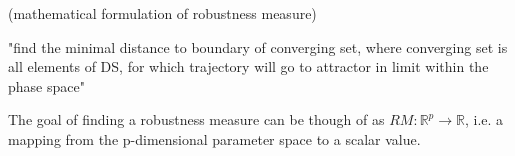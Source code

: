     (mathematical formulation of robustness measure)

    "find the minimal distance to boundary of converging set, where converging set is all elements of DS, for which trajectory will go to attractor in limit within the phase space"
    
    The goal of finding a robustness measure can be though of as $RM:\mathbb{R}^p \rightarrow \mathbb{R}$, i.e. a mapping from the p-dimensional parameter space to a scalar value.
    




    


    









